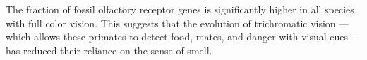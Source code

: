 The fraction of fossil olfactory receptor genes is significantly
higher in all species with full color vision. This suggests that
the evolution of trichromatic vision --- which allows these
primates to detect food, mates, and danger with visual cues ---
has reduced their reliance on the sense of smell.
